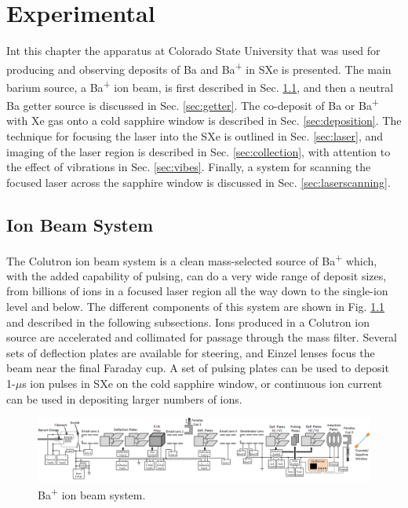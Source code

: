 \chapter{Experimental}



Int this chapter the apparatus at Colorado State University that was used for producing and observing  deposits of Ba and Ba\textsuperscript{+} in SXe is presented.  The main barium source, a Ba\textsuperscript{+} ion beam, is first described in Sec. \ref{sec:ionbeam}, and then a neutral Ba getter source is discussed in Sec. \ref{sec:getter}.  The co-deposit of Ba or Ba\textsuperscript{+} with Xe gas onto a cold sapphire window is described in Sec. \ref{sec:deposition}.  The technique for focusing the laser into the SXe is outlined in Sec. \ref{sec:laser}, and imaging of the laser region is described in Sec. \ref{sec:collection}, with attention to the effect of vibrations in Sec. \ref{sec:vibes}.  Finally, a system for scanning the focused laser across the sapphire window is discussed in Sec. \ref{sec:laserscanning}.

\section{Ion Beam System}
\label{sec:ionbeam}

The Colutron ion beam system is a clean mass-selected source of Ba\textsuperscript{+} which, with the added capability of pulsing, can do a very wide range of deposit sizes, from billions of ions in a focused laser region all the way down to the single-ion level and below.  The different components of this system are shown in Fig. \ref{fig:ionbeam} and described in the following subsections.  Ions produced in a Colutron ion source are accelerated and collimated for passage through the mass filter.  Several sets of deflection plates are available for steering, and Einzel lenses focus the beam near the final Faraday cup.  A set of pulsing plates can be used to deposit 1-$\mu$s ion pulses in SXe on the cold sapphire window, or continuous ion current can be used in depositing larger numbers of ions.

\vspace{20mm}

\begin{figure} %
        \centering
                \includegraphics[angle=90,width=.25\textwidth]{figures/ionBeam.png} %
                \caption{Ba\textsuperscript{+} ion beam system.}
\label{fig:ionbeam}
\end{figure}

